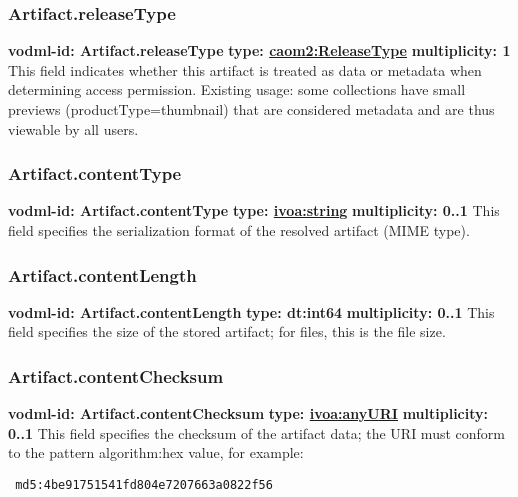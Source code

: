     \subsubsection{Artifact.releaseType}
      \textbf{vodml-id: Artifact.releaseType} \newline
      \textbf{type: \hyperref[sect:ReleaseType]{caom2:ReleaseType}} \newline
      \textbf{multiplicity: 1} \newline
      This field indicates whether this artifact is treated as data or metadata when determining access permission. Existing usage: some collections have small previews (productType=thumbnail) that are considered metadata and are thus viewable by all users.

    \subsubsection{Artifact.contentType}
      \textbf{vodml-id: Artifact.contentType} \newline
      \textbf{type: \hyperref[sect:ivoa]{ivoa:string}} \newline
      \textbf{multiplicity: 0..1} \newline
      This field specifies the serialization format of the resolved artifact (MIME type).

    \subsubsection{Artifact.contentLength}
      \textbf{vodml-id: Artifact.contentLength} \newline
      \textbf{type: dt:int64} \newline
      \textbf{multiplicity: 0..1} \newline
      This field specifies the size of the stored artifact; for files, this is the file size.

    \subsubsection{Artifact.contentChecksum}
      \textbf{vodml-id: Artifact.contentChecksum} \newline
      \textbf{type: \hyperref[sect:ivoa]{ivoa:anyURI}} \newline
      \textbf{multiplicity: 0..1} \newline
      This field specifies the checksum of the artifact data; the URI must conform to the pattern {algorithm}:{hex value}, for example: \begin{verbatim} md5:4be91751541fd804e7207663a0822f56 \end{verbatim}

